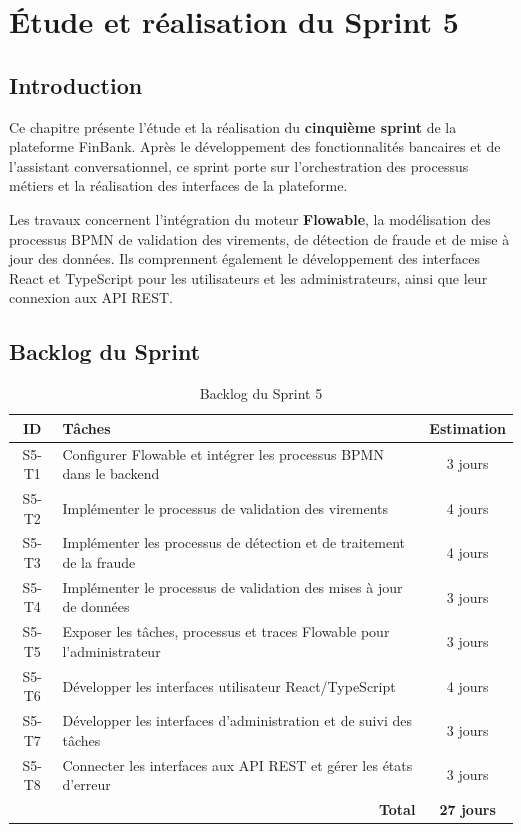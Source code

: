 \chapter{Étude et réalisation du Sprint 5}
\label{chap:sprint5}

\section{Introduction}
\label{sec:intro_sprint5}

Ce chapitre présente l'étude et la réalisation du
\textbf{cinquième sprint} de la plateforme FinBank. Après le
développement des fonctionnalités bancaires et de l'assistant
conversationnel, ce sprint porte sur l'orchestration des processus
métiers et la réalisation des interfaces de la plateforme.

Les travaux concernent l'intégration du moteur \textbf{Flowable}, la
modélisation des processus BPMN de validation des virements, de
détection de fraude et de mise à jour des données. Ils comprennent
également le développement des interfaces React et TypeScript pour les
utilisateurs et les administrateurs, ainsi que leur connexion aux API
REST.

\section{Backlog du Sprint}
\label{sec:backlog_sprint5}

\begin{table}[htbp]
\centering
\caption{Backlog du Sprint 5}
\label{tab:backlog_sprint5}
\renewcommand{\arraystretch}{1.3}
\begin{tabular}{|c|p{10cm}|c|}
\hline
\textbf{ID} & \textbf{Tâches} & \textbf{Estimation} \\
\hline
S5-T1 & Configurer Flowable et intégrer les processus BPMN dans le backend & 3 jours \\
\hline
S5-T2 & Implémenter le processus de validation des virements & 4 jours \\
\hline
S5-T3 & Implémenter les processus de détection et de traitement de la fraude & 4 jours \\
\hline
S5-T4 & Implémenter le processus de validation des mises à jour de données & 3 jours \\
\hline
S5-T5 & Exposer les tâches, processus et traces Flowable pour l'administrateur & 3 jours \\
\hline
S5-T6 & Développer les interfaces utilisateur React/TypeScript & 4 jours \\
\hline
S5-T7 & Développer les interfaces d'administration et de suivi des tâches & 3 jours \\
\hline
S5-T8 & Connecter les interfaces aux API REST et gérer les états d'erreur & 3 jours \\
\hline
\multicolumn{2}{|r|}{\textbf{Total}} & \textbf{27 jours} \\
\hline
\end{tabular}
\end{table}

